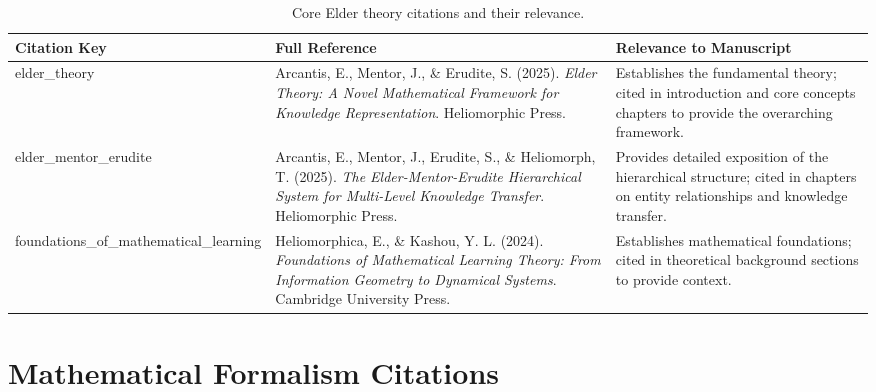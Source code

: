 \begin{table}[h]
\centering
\begin{tabular}{|p{2.5cm}|p{5cm}|p{6cm}|}
\hline
\textbf{Citation Key} & \textbf{Full Reference} & \textbf{Relevance to Manuscript} \\
\hline
elder\_theory & Arcantis, E., Mentor, J., \& Erudite, S. (2025). \textit{Elder Theory: A Novel Mathematical Framework for Knowledge Representation}. Heliomorphic Press. & Establishes the fundamental theory; cited in introduction and core concepts chapters to provide the overarching framework. \\
\hline
elder\_mentor\_erudite & Arcantis, E., Mentor, J., Erudite, S., \& Heliomorph, T. (2025). \textit{The Elder-Mentor-Erudite Hierarchical System for Multi-Level Knowledge Transfer}. Heliomorphic Press. & Provides detailed exposition of the hierarchical structure; cited in chapters on entity relationships and knowledge transfer. \\
\hline
foundations\_of\_mathematical\_learning & Heliomorphica, E., \& Kashou, Y. L. (2024). \textit{Foundations of Mathematical Learning Theory: From Information Geometry to Dynamical Systems}. Cambridge University Press. & Establishes mathematical foundations; cited in theoretical background sections to provide context. \\
\hline
\end{tabular}
\caption{Core Elder theory citations and their relevance.}
\label{tab:core_citations}
\end{table}

\section{Mathematical Formalism Citations}

